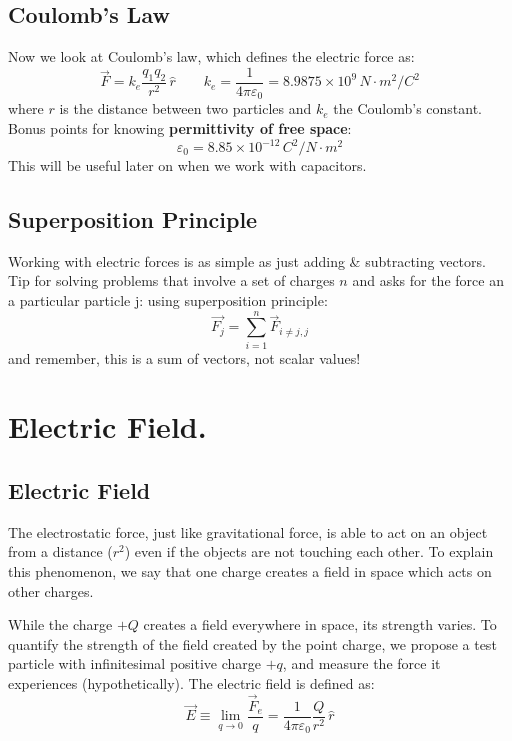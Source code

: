 \documentclass[11pt, letterpaper]{article}
\begin{document}
	\subsection{Coulomb's Law}
	Now we look at Coulomb's law, which defines the electric force as:
	\begin{equation}\label{eqn:coulomb-foce}
		\boxed{\vec{F} = k_e\frac{q_1q_2}{r^2}\,\hat{r} \qquad 
		k_e = \frac{1}{4\pi\varepsilon_0} = 8.9875 \times 10^9 \,N\cdot m^2/C^2}
	\end{equation}
	where $r$ is the distance between two particles and $k_e$ the Coulomb's constant. Bonus
	points for knowing \textbf{permittivity of free space}: \[\varepsilon_0 = 8.85 \times 
	10^{-12} \,C^2 / N\cdot m^2\] This will be useful later on when we work with capacitors. 

	\subsection{Superposition Principle}
	Working with electric forces is as simple as just adding \& subtracting vectors. Tip for solving
	problems that involve a set of charges $n$ and asks for the force an a particular particle j: using
	superposition principle: \[\vec{F_j} = \displaystyle\sum_{i = 1}^{n} \vec{F}_{i \neq j, j}\] and 
	remember, this is a sum of vectors, not scalar values!


\newpage
\section{Electric Field.}

	\subsection{Electric Field}
	The electrostatic force, just like gravitational force, is able to act on an object from a distance 
	($r^2$) even if the objects are not touching each other. To explain this phenomenon, we say 
	that one charge creates a field in space which acts on other charges.

	While the charge $+Q$ creates a field everywhere in space, its strength varies. To quantify the
	strength of the field created by the point charge, we propose a test particle with infinitesimal 
	positive charge $+q$, and measure the force it experiences (hypothetically). The electric field is 
	defined as:
	\begin{equation}\label{eqn:electric-field}
		\boxed{\vec{E} \equiv \displaystyle\lim_{q \to 0} \frac{\vec{F}_e}{q} =\frac{1}{4\pi
		\varepsilon_0}\frac{Q}{r^2}\,\hat{r}}
	\end{equation}
	
\end{document}
